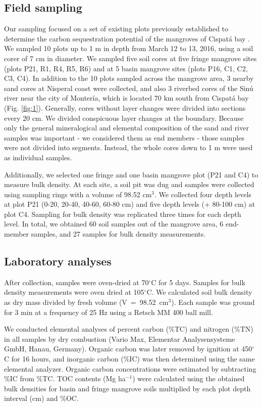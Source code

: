 \subsection{Field sampling}
Our sampling focused on a set of existing plots previously established to determine the carbon sequestration potential of the mangroves of Cispat\'a bay \citep{Bolivar2015}. We sampled 10 plots up to 1 m in depth from March 12 to 13, 2016, using a soil corer of 7 cm in diameter. We sampled five soil cores at five fringe mangrove sites (plots P21, R1, R4, R5, R6) and at 5  basin mangrove sites (plots P16, C1, C2, C3, C4). In addition to the 10 plots sampled across the mangrove area, 3 nearby sand cores at Nisperal coast were collected, and also 3 riverbed cores of the Sin\'{u} river near the city of Monter\'{i}a, which is located 70 km south from Cispat\'{a} bay (Fig. \ref{fig:1}). Generally, cores without layer changes were divided into sections every 20 cm. We divided conspicuous layer changes at the boundary. Because only the general mineralogical and elemental composition of the sand and river samples was important - we considered them as end members - those samples were not divided into segments. Instead, the whole cores down to 1 m were used as individual samples. \par
Additionally, we selected one fringe and one basin mangrove plot (P21 and C4) to measure bulk density. At each site, a soil pit was dug and samples were collected using sampling rings with a volume of 98.52 cm$^3$. We collected four depth levels at plot P21 (0-20, 20-40, 40-60, 60-80 cm) and five depth levels (+ 80-100 cm) at plot C4. Sampling for bulk density was replicated three times for each depth level. In total, we obtained 60 soil samples out of the mangrove area, 6 end-member samples, and 27 samples for bulk density measurements.
\label{sec:2}

\subsection{Laboratory analyses}
After collection, samples were oven-dried at 70$^{\circ}$C for 5 days. Samples for bulk density measurements were oven dried at 105$^{\circ}$C. We calculated soil bulk density as dry mass divided by fresh volume \mbox{(V = 98.52 cm$^3$)}. Each sample was ground for 3 min at a frequency of 25 Hz using a Retsch MM 400 ball mill. 

We conducted elemental analyses of percent  carbon (\%TC) and nitrogen (\%TN) in all samples by dry combustion (Vario Max, Elementar Analysensysteme GmbH, Hanau, Germany). Organic carbon was later removed by ignition at 450$^{\circ}$C for 16 hours, and inorganic carbon  (\%IC) was then determined using the same elemental analyzer. Organic carbon concentrations were estimated by subtracting \%IC from \%TC. TOC contents (Mg ha$^{-1}$) were calculated using the obtained bulk densities for basin and fringe mangrove soils multiplied by each plot depth interval (cm) and \%OC.

